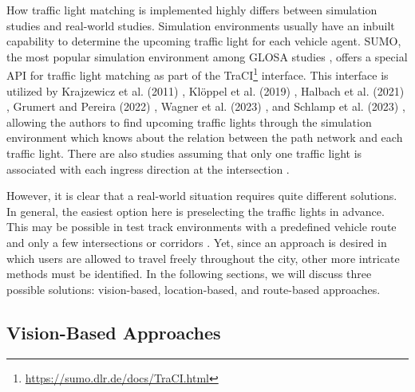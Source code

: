 How traffic light matching is implemented highly differs between simulation studies and real-world studies. Simulation environments usually have an inbuilt capability to determine the upcoming traffic light for each vehicle agent. SUMO, the most popular simulation environment among GLOSA studies \cite{krajzewicz_preparing_2012, erdmann_combining_2013, eckhoff_potentials_2013, tal_vehicular-communications-based_2016, nguyen_efficient_2016, olaverri-monreal_implementation_2018, karoui_efficiency_2018, pariota_green_2019, kloeppel_performance_2019, lu_green_2020, halbach_cooperative_2021, bhattacharyya_assessing_2022, grumert_heads-up_2022, wagner_spatmap_2023}, offers a special API for traffic light matching as part of the TraCI\footnote{\url{https://sumo.dlr.de/docs/TraCI.html}} interface. This interface is utilized by Krajzewicz et al. (2011) \cite{krajzewicz_preparing_2012}, Klöppel et al. (2019) \cite{kloeppel_performance_2019}, Halbach et al. (2021) \cite{halbach_cooperative_2021}, Grumert and Pereira (2022) \cite{grumert_heads-up_2022}, Wagner et al. (2023) \cite{wagner_spatmap_2023}, and Schlamp et al. (2023) \cite{todo}, allowing the authors to find upcoming traffic lights through the simulation environment which knows about the relation between the path network and each traffic light. There are also studies assuming that only one traffic light is associated with each ingress direction at the intersection \cite{xia_indirect_2011, li_multi-vehicles_2014, plianos_predictive_2018}.

However, it is clear that a real-world situation requires quite different solutions. In general, the easiest option here is preselecting the traffic lights in advance. This may be possible in test track environments with a predefined vehicle route and only a few intersections \cite{chen_developing_2022} or corridors \cite{fickas_fast_2019}. Yet, since an approach is desired in which users are allowed to travel freely throughout the city, other more intricate methods must be identified. In the following sections, we will discuss three possible solutions: vision-based, location-based, and route-based approaches.

\subsection{Vision-Based Approaches}

